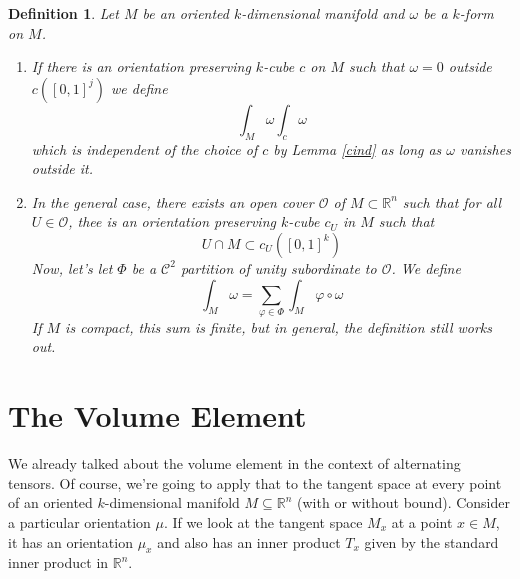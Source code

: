 \documentclass{article}
\newtheorem{definition}{Definition}
\newcommand{\reals}[0]{\mathbb{R}}
\newcommand{\mc}[1]{\mathcal{#1}}
\begin{document}
\begin{definition}
  Let \(M\) be an oriented \(k\)-dimensional manifold and \(\omega\) be a \(k\)-form on \(M\).
  \begin{enumerate}

    \item If there is an orientation preserving \(k\)-cube \(c\) on \(M\) such that \(\omega = 0\) outside \(c([0, 1]^j)\) we define
    \begin{equation}
      \int_M\omega \int_c\omega
    \end{equation}
    which is independent of the choice of \(c\) by Lemma \ref{cind} as long as \(\omega\) vanishes outside it.

    \item In the general case, there exists an open cover \(\mc{O}\) of \(M \subset \reals^n\) such that for all \(U \in \mc{O}\), thee is an orientation preserving \(k\)-cube \(c_U\) in \(M\) such that
    \begin{equation}
      U \cap M \subset c_U([0, 1]^k)
    \end{equation}
    Now, let's let \(\Phi\) be a \(\mc{C}^2\) partition of unity subordinate to \(\mc{O}\). We define
    \begin{equation}
      \int_M\omega = \sum_{\varphi \in \Phi}\int_{M}\varphi \circ \omega
    \end{equation}
    If \(M\) is compact, this sum is finite, but in general, the definition still works out.

  \end{enumerate}
\end{definition}


\section{The Volume Element}

We already talked about the volume element in the context of alternating tensors. Of course, we're going to apply that to the tangent space at every point of an oriented \(k\)-dimensional manifold \(M \subseteq \reals^n\) (with or without bound). Consider a particular orientation \(\mu\). If we look at the tangent space \(M_x\) at a point \(x \in M\), it has an orientation \(\mu_x\) and also has an inner product \(T_x\) given by the standard inner product in \(\reals^n\).
\end{document}
